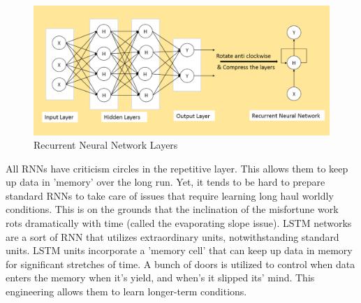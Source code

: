 \begin{figure}[ht]
    \centering
    \includegraphics[scale=0.5]{Chap3/RNN.PNG}
    \caption{Recurrent Neural Network Layers}
    \label{fig:RNN}
\end{figure}

\vspace{.5cm}
All RNNs have criticism circles in the repetitive layer. This allows them to keep up data in 'memory' over the long run. Yet, it tends to be hard to prepare standard RNNs to take care of issues that require learning long haul worldly conditions. This is on the grounds that the inclination of the misfortune work rots dramatically with time (called the evaporating slope issue). LSTM networks are a sort of RNN that utilizes extraordinary units, notwithstanding standard units. LSTM units incorporate a 'memory cell' that can keep up data in memory for significant stretches of time. A bunch of doors is utilized to control when data enters the memory when it's yield, and when's it slipped its' mind. This engineering allows them to learn longer-term conditions.

